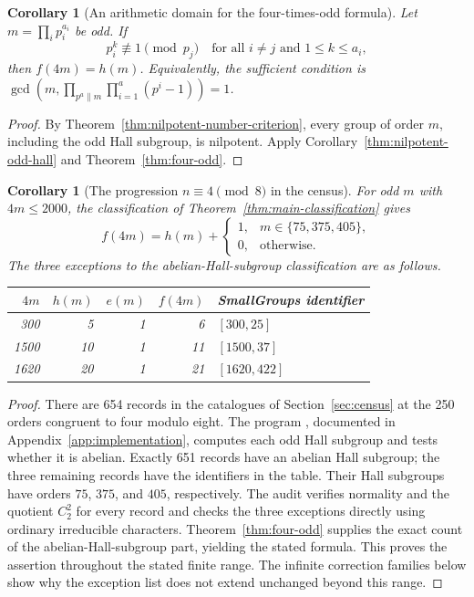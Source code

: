 \documentclass[11pt,a4paper]{amsart}
\newtheorem{corl}[thm]{Corollary}
\theoremstyle{definition}
\theoremstyle{remark}
\numberwithin{equation}{section}
\begin{document}
\begin{corl}[An arithmetic domain for the four-times-odd formula]
\label{cor:nilpotent-numbers}
Let $m=\prod_i p_i^{a_i}$ be odd. If
\[
 p_i^k\not\equiv1\pmod{p_j}
 \quad\text{for all }i\ne j\text{ and }1\le k\le a_i,
\]
then $f(4m)=h(m)$.
Equivalently, the sufficient condition is
$\gcd(m,\prod_{p^a\parallel m}\prod_{i=1}^a(p^i-1))=1$.
\end{corl}
\begin{proof}
By Theorem~\ref{thm:nilpotent-number-criterion}, every group of
order $m$, including the odd Hall subgroup, is nilpotent. Apply
Corollary~\ref{thm:nilpotent-odd-hall} and
Theorem~\ref{thm:four-odd}.
\end{proof}


\begin{corl}[The progression $n\equiv4\pmod8$ in the census]
\label{cor:four-odd-census}
For odd $m$ with $4m\le2000$, the classification of
Theorem~\ref{thm:main-classification} gives
\begin{equation}\label{eq:four-odd-finite}
 \boxed{f(4m)=h(m)+
 \begin{cases}1,&m\in\{75,375,405\},\\0,&\text{otherwise}.
 \end{cases}}
\end{equation}
The three exceptions to the abelian-Hall-subgroup classification are
as follows.
\begin{center}
\begin{tabular}{rrrrl}
\toprule
$4m$&$h(m)$&$e(m)$&$f(4m)$&SmallGroups identifier\\\midrule
300&5&1&6&$[300,25]$\\
1500&10&1&11&$[1500,37]$\\
1620&20&1&21&$[1620,422]$\\\bottomrule
\end{tabular}
\end{center}
\end{corl}
\begin{proof}
There are 654 records in the catalogues of Section~\ref{sec:census}
at the 250 orders congruent to four modulo eight. The program
, documented in
Appendix~\ref{app:implementation}, computes each odd Hall subgroup
and tests whether it is abelian. Exactly 651 records have an abelian
Hall subgroup; the three remaining records have the identifiers in
the table. Their Hall subgroups have orders $75$, $375$, and $405$,
respectively. The audit verifies normality and the quotient $C_2^2$
for every record and checks the three exceptions directly using
ordinary irreducible characters. Theorem~\ref{thm:four-odd} supplies
the exact count of the abelian-Hall-subgroup part, yielding the stated
formula. This proves the assertion throughout the stated finite range.
The infinite correction families below show why the exception list
does not extend unchanged beyond this range.
\end{proof}
\end{document}
